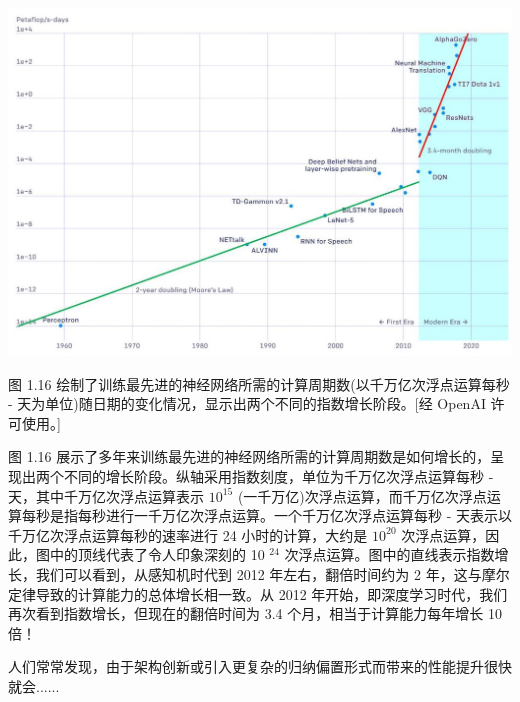 \documentclass[10pt]{article}
\begin{document}
\begin{center}
\includegraphics[max width=1.0\textwidth]{images/0194e279-9b28-703a-88f4-c3ac21e2010d_40_255_347_1276_882_0.jpg}
\end{center}
\hspace*{3em} 

图 1.16 绘制了训练最先进的神经网络所需的计算周期数(以千万亿次浮点运算每秒 - 天为单位)随日期的变化情况，显示出两个不同的指数增长阶段。[经 OpenAI 许可使用。]

图 1.16 展示了多年来训练最先进的神经网络所需的计算周期数是如何增长的，呈现出两个不同的增长阶段。纵轴采用指数刻度，单位为千万亿次浮点运算每秒 - 天，其中千万亿次浮点运算表示 \({10}^{15}\) (一千万亿)次浮点运算，而千万亿次浮点运算每秒是指每秒进行一千万亿次浮点运算。一个千万亿次浮点运算每秒 - 天表示以千万亿次浮点运算每秒的速率进行 24 小时的计算，大约是 \({10}^{20}\) 次浮点运算，因此，图中的顶线代表了令人印象深刻的 10 \({}^{24}\) 次浮点运算。图中的直线表示指数增长，我们可以看到，从感知机时代到 2012 年左右，翻倍时间约为 2 年，这与摩尔定律导致的计算能力的总体增长相一致。从 2012 年开始，即深度学习时代，我们再次看到指数增长，但现在的翻倍时间为 3.4 个月，相当于计算能力每年增长 10 倍！

人们常常发现，由于架构创新或引入更复杂的归纳偏置形式而带来的性能提升很快就会......
\end{document}
